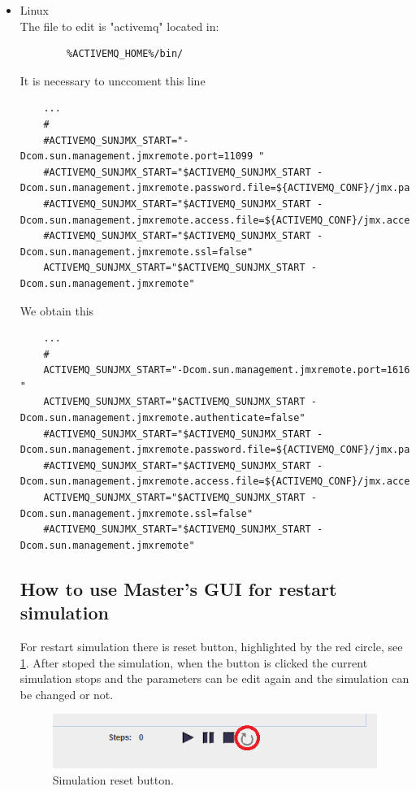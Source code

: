 \documentclass{article}
\begin{document}
\begin{itemize}
\item Linux\\
The file to edit is "activemq" located in:
\lstset{language=Java}
\begin{lstlisting}	
		%ACTIVEMQ_HOME%/bin/
\end{lstlisting}
It is necessary to unccoment this line



\begin{lstlisting}
	...
	#
	#ACTIVEMQ_SUNJMX_START="-Dcom.sun.management.jmxremote.port=11099 "
	#ACTIVEMQ_SUNJMX_START="$ACTIVEMQ_SUNJMX_START -Dcom.sun.management.jmxremote.password.file=${ACTIVEMQ_CONF}/jmx.password"
	#ACTIVEMQ_SUNJMX_START="$ACTIVEMQ_SUNJMX_START -Dcom.sun.management.jmxremote.access.file=${ACTIVEMQ_CONF}/jmx.access"
	#ACTIVEMQ_SUNJMX_START="$ACTIVEMQ_SUNJMX_START -Dcom.sun.management.jmxremote.ssl=false"
	ACTIVEMQ_SUNJMX_START="$ACTIVEMQ_SUNJMX_START -Dcom.sun.management.jmxremote"
\end{lstlisting}

We obtain this
\begin{lstlisting}
	...
	#
	ACTIVEMQ_SUNJMX_START="-Dcom.sun.management.jmxremote.port=1616 "
	ACTIVEMQ_SUNJMX_START="$ACTIVEMQ_SUNJMX_START -Dcom.sun.management.jmxremote.authenticate=false"
	#ACTIVEMQ_SUNJMX_START="$ACTIVEMQ_SUNJMX_START -Dcom.sun.management.jmxremote.password.file=${ACTIVEMQ_CONF}/jmx.password"
	#ACTIVEMQ_SUNJMX_START="$ACTIVEMQ_SUNJMX_START -Dcom.sun.management.jmxremote.access.file=${ACTIVEMQ_CONF}/jmx.access"
	ACTIVEMQ_SUNJMX_START="$ACTIVEMQ_SUNJMX_START -Dcom.sun.management.jmxremote.ssl=false"
	#ACTIVEMQ_SUNJMX_START="$ACTIVEMQ_SUNJMX_START -Dcom.sun.management.jmxremote"

\end{lstlisting}

\subsection{How to use Master’s GUI for restart simulation}

For restart simulation there is reset button, highlighted by the red circle, see \ref{fig:mastersr}. After stoped the simulation, when the button is clicked the current simulation stops and the parameters can be edit again and the simulation can be changed or not.

\begin{figure}
\centering
\includegraphics[width=1.3\textwidth, bb=0 0 1012 300]{resetDetail.png}
\caption{Simulation reset button. \label{fig:mastersr}}
\end{figure}


\end{itemize}
\end{document}
